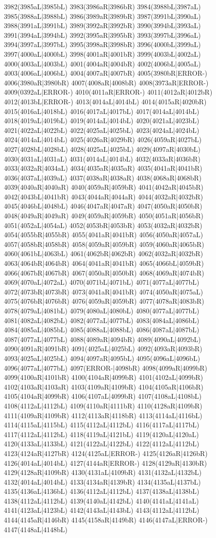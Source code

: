 3982(3985aL|3985bL) 3983(3986aR|3986bR) 3984(3988bL|3987aL) 3985(3988aL|3988bL) 3986(3989aR|3989bR) 3987(3991bL|3990aL) 3988(3991aL|3991bL) 3989(3992aR|3992bR) 3990(3994bL|3993aL) 3991(3994aL|3994bL) 3992(3995aR|3995bR) 3993(3997bL|3996aL) 3994(3997aL|3997bL) 3995(3998aR|3998bR) 3996(4000bL|3999aL) 3997(4000aL|4000bL) 3998(4001aR|4001bR) 3999(4003bL|4002aL) 4000(4003aL|4003bL) 4001(4004aR|4004bR) 4002(4006bL|4005aL) 4003(4006aL|4006bL) 4004(4007aR|4007bR) 4005(3980bR|ERROR-) 4006(3980aR|3980bR) 4007(4008aR|4008bR) 4008(3973aR|ERROR-) 4009(0392aL|ERROR-) 4010(4011aR|ERROR-) 4011(4012aR|4012bR) 4012(4013bL|ERROR-) 4013(4014aL|4014bL) 4014(4015aR|4020bR) 4015(4016aL|4018bL) 4016(4017aL|4017bL) 4017(4014aL|4014bL) 4018(4019aL|4019bL) 4019(4014aL|4014bL) 4020(4021aL|4023bL) 4021(4022aL|4022bL) 4022(4025aL|4025bL) 4023(4024aL|4024bL) 4024(4014aL|4014bL) 4025(4026aR|4029bR) 4026(4059aR|4027bL) 4027(4028bL|4028bL) 4028(4025aL|4025bL) 4029(4097aR|4030bL) 4030(4031aL|4031aL) 4031(4014aL|4014bL) 4032(4033aR|4036bR) 4033(4032aR|4034aL) 4034(4035aR|4035aR) 4035(4041aR|4041bR) 4036(4037aL|4039aL) 4037(4038aR|4038aR) 4038(4068aR|4068bR) 4039(4040aR|4040aR) 4040(4059aR|4059bR) 4041(4042aR|4045bR) 4042(4043bL|4041bR) 4043(4044aR|4044aR) 4044(4032aR|4032bR) 4045(4046bL|4048bL) 4046(4047aR|4047aR) 4047(4050aR|4050bR) 4048(4049aR|4049aR) 4049(4059aR|4059bR) 4050(4051aR|4056bR) 4051(4052aL|4054aL) 4052(4053bR|4053bR) 4053(4032aR|4032bR) 4054(4055bR|4055bR) 4055(4041aR|4041bR) 4056(4050aR|4057aL) 4057(4058bR|4058bR) 4058(4059aR|4059bR) 4059(4060aR|4065bR) 4060(4061bL|4063bL) 4061(4062bR|4062bR) 4062(4032aR|4032bR) 4063(4064bR|4064bR) 4064(4041aR|4041bR) 4065(4066bL|4059bR) 4066(4067bR|4067bR) 4067(4050aR|4050bR) 4068(4069aR|4074bR) 4069(4070aL|4072aL) 4070(4071bL|4071bL) 4071(4077aL|4077bL) 4072(4073bR|4073bR) 4073(4041aR|4041bR) 4074(4050aR|4075aL) 4075(4076bR|4076bR) 4076(4059aR|4059bR) 4077(4078aR|4083bR) 4078(4079aL|4081bL) 4079(4080aL|4080bL) 4080(4077aL|4077bL) 4081(4082aL|4082bL) 4082(4077aL|4077bL) 4083(4084aL|4086bL) 4084(4085aL|4085bL) 4085(4088aL|4088bL) 4086(4087aL|4087bL) 4087(4077aL|4077bL) 4088(4089aR|4094bR) 4089(4090aL|4092bL) 4090(4091aR|4091bR) 4091(4025aL|4025bL) 4092(4093aR|4093bR) 4093(4025aL|4025bL) 4094(4097aR|4095bL) 4095(4096aL|4096bL) 4096(4077aL|4077bL) 4097(ERROR-|4098bR) 4098(4099aR|4099bR) 4099(4100aR|4101bR) 4100(4104aR|4099bR) 4101(4102aL|4099bR) 4102(4103aR|4103aR) 4103(4109aR|4109bR) 4104(4105aR|4106bR) 4105(4104aR|4099bR) 4106(4107aL|4099bR) 4107(4108aL|4108bL) 4108(4112aL|4112bL) 4109(4110aR|4111bR) 4110(4128aR|4109bR) 4111(4109aR|4109bR) 4112(4113aR|4118bR) 4113(4114aL|4116bL) 4114(4115aL|4115bL) 4115(4112aL|4112bL) 4116(4117aL|4117bL) 4117(4112aL|4112bL) 4118(4119aL|4121bL) 4119(4120aL|4120aL) 4120(4133aL|4133bL) 4121(4122aL|4122bL) 4122(4112aL|4112bL) 4123(4124aR|4127bR) 4124(4125aL|ERROR-) 4125(4126aR|4126bR) 4126(4014aL|4014bL) 4127(4144aR|ERROR-) 4128(4129aR|4130bR) 4129(4128aR|4109bR) 4130(4131aL|4109bR) 4131(4132aL|4132bL) 4132(4014aL|4014bL) 4133(4134aR|4139bR) 4134(4135aL|4137bL) 4135(4136aL|4136bL) 4136(4112aL|4112bL) 4137(4138aL|4138bL) 4138(4112aL|4112bL) 4139(4140aL|4142bL) 4140(4141aL|4141aL) 4141(4123aL|4123bL) 4142(4143aL|4143bL) 4143(4112aL|4112bL) 4144(4145aR|4146bR) 4145(4158aR|4149bR) 4146(4147aL|ERROR-) 4147(4148aL|4148bL) 